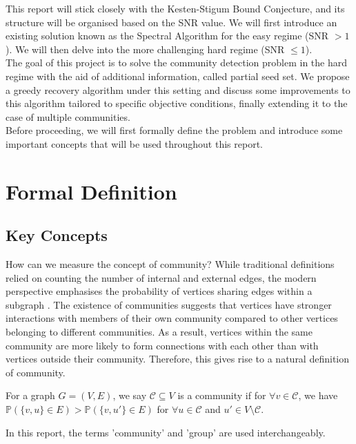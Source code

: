 This report will stick closely with the Kesten-Stigum Bound Conjecture, and its structure will be organised based on the SNR value. We will first introduce an existing solution known as the Spectral Algorithm for the easy regime (SNR $>1$). We will then delve into the more challenging hard regime (SNR $\leq1$).\\
The goal of this project is to solve the community detection problem in the hard regime with the aid of additional information, called partial seed set. We propose a greedy recovery algorithm under this setting and discuss some improvements to this algorithm tailored to specific objective conditions, finally extending it to the case of multiple communities.\\

Before proceeding, we will first formally define the problem and introduce some important concepts that will be used throughout this report.

\section{Formal Definition}
\subsection{Key Concepts}
How can we measure the concept of community?  While traditional definitions relied on counting the number of internal and external edges, the modern perspective emphasises the probability of vertices sharing edges within a subgraph \cite{userguide}. The existence of communities suggests that vertices have stronger interactions with members of their own community compared to other vertices belonging to different communities. As a result, vertices within the same community are more likely to form connections with each other than with vertices outside their community. Therefore, this gives rise to a natural definition of community.
\begin{definition}
   For a graph $G=(V,E)$, we say $\mathcal{C}\subseteq V$ is a community if for $\forall v\in \mathcal{C}$, we have $\mathbb{P}\left(\{v,u\}\in E\right)>\mathbb{P}\left(\{v,u'\}\in E\right)$ for $\forall u\in \mathcal{C}$ and $u'\in V\setminus \mathcal{C}$.
\end{definition}
\begin{remark}
    In this report, the terms 'community' and 'group' are used interchangeably.
\end{remark}

